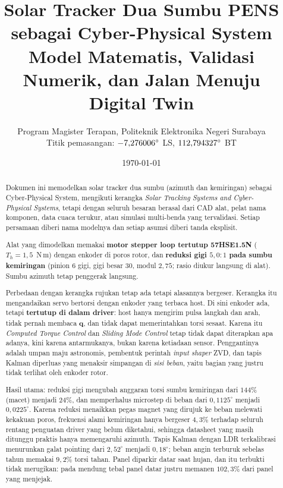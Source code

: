 \documentclass[11pt,a4paper]{article}
\title{\textbf{Solar Tracker Dua Sumbu PENS\\ sebagai Cyber-Physical System}\\[0.4em]
\large Model Matematis, Validasi Numerik, dan Jalan Menuju Digital Twin}
\author{Program Magister Terapan, Politeknik Elektronika Negeri Surabaya\\
Titik pemasangan: $-7{,}276006\degg$ LS, $112{,}794327\degg$ BT}
\date{\today}
\newcommand{\degg}{^\circ}
\begin{document}
\maketitle

\begin{abstract}
\noindent
Dokumen ini memodelkan solar tracker dua sumbu (azimuth dan kemiringan) sebagai Cyber-Physical System,
mengikuti kerangka \emph{Solar Tracking Systems and Cyber-Physical Systems}, tetapi dengan seluruh besaran
berasal dari CAD alat, pelat nama komponen, data cuaca terukur, atau simulasi multi-benda yang tervalidasi.
Setiap persamaan diberi nama modelnya dan setiap asumsi diberi tanda eksplisit.

Alat yang dimodelkan memakai \textbf{motor stepper loop tertutup 57HSE1.5N} ($T_h = 1{,}5$~N\,m) dengan
enkoder di poros rotor, dan \textbf{reduksi gigi $5{,}0{:}1$ pada sumbu kemiringan} (pinion 6 gigi, gigi
besar 30, modul $2{,}75$; rasio diukur langsung di alat). Sumbu azimuth tetap penggerak langsung.

Perbedaan dengan kerangka rujukan tetap ada tetapi alasannya bergeser. Kerangka itu mengandaikan servo
bertorsi dengan enkoder yang terbaca host. Di sini enkoder ada, tetapi \textbf{tertutup di dalam driver}:
host hanya mengirim pulsa langkah dan arah, tidak pernah membaca $\bm{q}$, dan tidak dapat memerintahkan
torsi sesaat. Karena itu \emph{Computed Torque Control} dan \emph{Sliding Mode Control} tetap tidak dapat
diterapkan apa adanya, kini karena antarmukanya, bukan karena ketiadaan sensor. Penggantinya adalah umpan
maju astronomis, pembentuk perintah \emph{input shaper} ZVD, dan tapis Kalman diperluas yang menaksir
simpangan di \emph{sisi beban}, yaitu bagian yang justru tidak terlihat oleh enkoder rotor.

Hasil utama: reduksi gigi mengubah anggaran torsi sumbu kemiringan dari $144\%$ (macet) menjadi $24\%$, dan
memperhalus microstep di beban dari $0{,}1125\degg$ menjadi $0{,}0225\degg$. Karena reduksi menaikkan pegas
magnet yang dirujuk ke beban melewati kekakuan poros, frekuensi alami kemiringan hanya bergeser $4{,}3\%$
terhadap seluruh rentang penguatan driver yang belum diketahui, sehingga datasheet yang masih ditunggu
praktis hanya memengaruhi azimuth. Tapis Kalman dengan LDR terkalibrasi menurunkan galat pointing dari
$2{,}52\degg$ menjadi $0{,}18\degg$; beban angin terburuk sebelas tahun memakai $9{,}2\%$ torsi tahan.
Panel diparkir datar saat hujan, dan itu terbukti tidak merugikan: pada mendung tebal panel datar justru
memanen $102{,}3\%$ dari panel yang menjejak.
\end{abstract}
\end{document}
